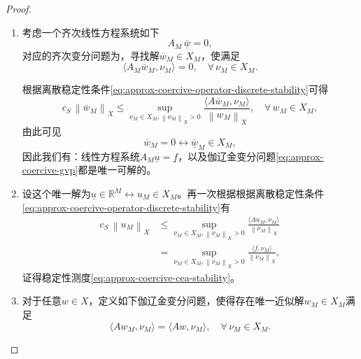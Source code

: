 \begin{proof}
  \begin{enumerate}
\item 考虑一个齐次线性方程系统如下
\begin{equation*}
  A_{M} \, \underline{\bar{w}} = 0,
\end{equation*}
对应的齐次变分问题为，寻找解$\overline{w}_{M} \in X_{M}$，使满足
\begin{equation*}
  \langle A_{M} \overline{w}_{M}, \nu_{M} \rangle =0, \quad \forall \, \nu_{M} \in X_{M}.
\end{equation*}

根据离散稳定性条件\eqref{eq:approx-coercive-operator-discrete-stability}可得
\begin{equation*}
  c_{S} \, \left\| \bar{w}_{M} \right\|_{X}
  \le \sup_{\nu_{M} \in X_{M}, \left\| \nu_{M} \right\|_{X} > 0}
  \frac{
  \langle A \bar{w}_{M}, \nu_{M} \rangle
  }{
  \left\| w_{M} \right\|_{X}
  }, \quad \forall \, w_{M} \in X_{M},
\end{equation*}
由此可见
\begin{equation*}
  \bar{w}_{M} = 0 \leftrightarrow \underline{\bar{w}}_{M} \in X_{M},
\end{equation*}
因此我们有：线性方程系统$A_{M} \underline{u} = \underline{f}$，以及伽辽金变分问题\eqref{eq:approx-coercive-gvp}都是唯一可解的。

\item 设这个唯一解为$\underline{u} \in \mathbb{R}^{M} \leftrightarrow u_{M} \in X_{M}$。再一次根据根据离散稳定性条件\eqref{eq:approx-coercive-operator-discrete-stability}有
\begin{equation*}
  \begin{split}
    c_{S} \, \left\| u_{M} \right\|_{X}
    & \le \sup_{\nu_{M} \in X_{M}, \left\| \nu_{M} \right\|_{X} > 0}
    \frac{
    \langle A u_{M}, \nu_{M} \rangle
    }{
    \left\| \nu_{M} \right\|_{X}
    } \\
    & =
    \sup_{\nu_{M} \in X_{M}, \left\| \nu_{M} \right\|_{X} > 0}
    \frac{
    \langle f, \nu_{M} \rangle
    }{
    \left\| \nu_{M} \right\|_{X}
    },
  \end{split}
\end{equation*}
证得稳定性测度\eqref{eq:approx-coercive-cea-stability}。

\item 对于任意$w \in X$，定义如下伽辽金变分问题，使得存在唯一近似解$w_{M} \in X_{M}$满足
\begin{equation*}
  \langle A w_{M}, \nu_{M} \rangle = \langle A w, \nu_{M} \rangle, \quad \forall \, \nu_{M} \in X_{M}.
\end{equation*}


\end{enumerate}
\end{proof}
